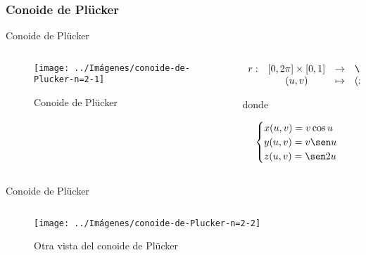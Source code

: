 \documentclass[10pt]{beamer}
\begin{document}
	\subsubsection{Conoide de Plücker}
	
	\begin{frame}{Conoide de Plücker}
		\begin{columns}[t] %
			\begin{column}{.50\textwidth}
				\begin{figure}
					\centering
					\texttt{[image: ../Imágenes/conoide-de-Plucker-n=2-1]}
					\caption{Conoide de Plücker}
					\label{fig:conoide-de-Plucker-1}
				\end{figure}
			\end{column}%
			\hfill%
			\begin{column}{.50\textwidth}
				$$\begin{array}{rcll}
				r : & [0, 2\pi] \times [0,1] & \to & \R^3\\
				& (u,v) & \mapsto & (x,y,z)
				\end{array}$$
				
				donde 
				
				$$ \begin{cases}
				x(u,v) = v \cos u \\
				y(u,v) = v \sen u \\
				z(u,v) = \sen 2u
				\end{cases} $$
			\end{column}%
		\end{columns}
	\end{frame}
	
	\begin{frame}{Conoide de Plücker}
		\begin{columns}[t] %
			\begin{column}{.50\textwidth}
				\begin{figure}
					\centering
					\texttt{[image: ../Imágenes/conoide-de-Plucker-n=2-2]}
					\caption{Otra vista del conoide de Plücker}
					\label{fig:conoide-de-Plücker-2}
				\end{figure}
			\end{column}%
			\hfill%
			\begin{column}{.50\textwidth}
			\end{column}%
		\end{columns}
	\end{frame}
	
\end{document}
